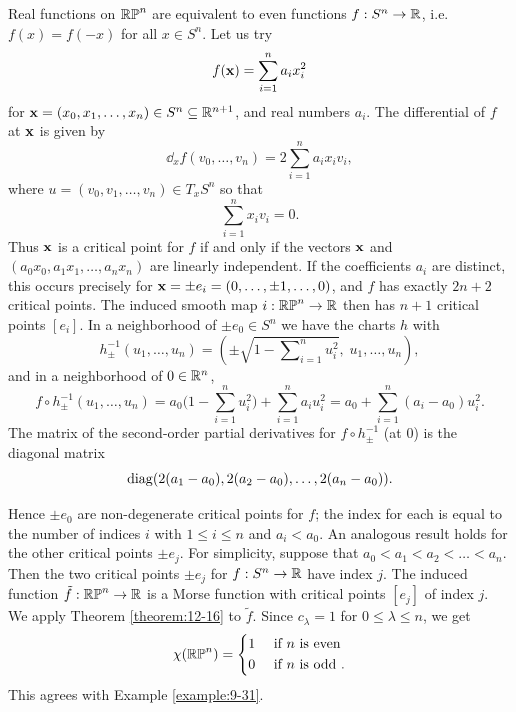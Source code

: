\begin{example}\label{example:12-20}
  Real functions on $\mathbb{RP}^n$ are equivalent to even functions $f:S^n\to{\ensuremath{\mathbb{R}}}$, 
  i.e. $f(x) = f(-x)$ for all $x\in S^n$. Let us try
  \[
    f(\mathbf{x}) = \sum_{i=1 }^{n }{a_ix_i^2}
  \] 
  for $\mathbf{x} = (x_0, x_1, \ldots, x_n)\in S^n\subseteq{\ensuremath{\mathbb{R}}}^{n+1}$, and real numbers $a_i$. The differential 
  of $f$ at $\mathbf{x}$ is given by  
  \[
    \dd_xf(v_0, \ldots, v_n) = 2\sum_{i=1 }^{n }{a_ix_iv_i},
  \]  
  where $u=(v_0, v_1, \ldots, v_n)\in T_xS^n$ so that 
  \[
    \sum_{i=1 }^{n }{x_iv_i} = 0.
  \]
  Thus $\mathbf{x}$ is a critical point for $f$ if and only if the vectors $\mathbf{x}$ and
  $(a_0x_0, a_1x_1, \ldots, a_nx_n)$ are linearly independent. If the coefficients $a_i$ are
  distinct, this occurs precisely for $\mathbf{x} = \pm e_i = (0,\ldots, \pm1,\ldots,0)$, and $f$ has exactly $2n+2$ critical 
  points. The induced smooth map $i:\mathbb{RP}^n\to{\ensuremath{\mathbb{R}}}$ then has $n+1$ critical points $[e_i]$. In a neighborhood 
  of $\pm e_0\in S^n$ we have the charts $h$ with
  \[
    h_\pm^{-1}(u_1, \ldots, u_n)
    = \left(\pm\sqrt{1-\sum\nolimits_{i=1}^nu_i^2},\; u_1, \ldots, u_n\right),
  \]
  and in a neighborhood of $0\in{\ensuremath{\mathbb{R}}}^n$,
  \[
    f\circ h_\pm^{-1}(u_1, \ldots, u_n)
    = a_0\biggl(1-\sum_{i=1}^n u_i^2\biggr) + \sum_{i=1}^{n }{a_iu_i^2}
    = a_0 + \sum_{i=1}^{n }{(a_i-a_0)u_i^2}.
  \]
  The matrix of the second-order partial derivatives for $f\circ h_\pm^{-1}$ (at 0) is the 
  diagonal matrix
  \[
    \mathrm{diag}(2(a_1-a_0), 2(a_2-a_0), \ldots, 2(a_n-a_0)).
  \]

  Hence $\pm e_0$ are non-degenerate critical points for $f$; the index for each is equal
  to the number of indices $i$ with $1\le i\le n$ and $a_i < a_0$. An analogous result
  holds for the other critical points $\pm e_j$. For simplicity, suppose that 
  $a_0 < a_1 <a_2 < \ldots < a_n$. Then the two critical points $\pm e_j$ for $f:S^n\to{\ensuremath{\mathbb{R}}}$ have index $j$.
  The induced function $\tilde{f}:\mathbb{RP}^n\to{\ensuremath{\mathbb{R}}}$ is a Morse function with critical points $[e_j]$ of
  index $j$. We apply Theorem \ref{theorem:12-16} to $\tilde{f}$. Since $c_\lambda=1$ for $0\le\lambda\le n$, 
  we get
  \begin{align*}
    \chi(\mathbb{RP}^n)
    = \left\{\begin{aligned}
      1\quad & \text{ if $n$ is even } \\
      0\quad & \text{ if $n$ is odd }. 
    \end{aligned}\right.
  \end{align*}
  This agrees with Example \ref{example:9-31}.
\end{example}

